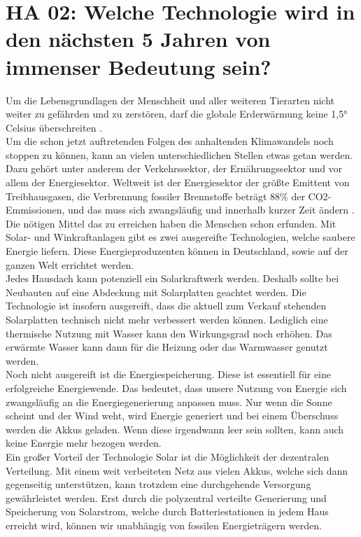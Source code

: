 \chapter{HA 02: Welche Technologie wird in den nächsten 5 Jahren von immenser Bedeutung sein?}
Um die Lebensgrundlagen der Menschheit und aller weiteren Tierarten nicht weiter zu gefährden und zu zerstören, darf die globale Erderwärmung keine 1,5° Celsius überschreiten \cite{masson-delmotte_ipcc_2019}.\\
Um die schon jetzt auftretenden Folgen des anhaltenden Klimawandels noch stoppen zu können, kann an vielen unterschiedlichen Stellen etwas getan werden. Dazu gehört unter anderem der Verkehrssektor, der Ernährungssektor und vor allem der Energiesektor. Weltweit ist der Energiesektor der größte Emittent von Treibhausgasen, die Verbrennung fossiler Brennstoffe beträgt 88\% der CO2-Emmissionen, und das muss sich zwangsläufig und innerhalb kurzer Zeit ändern \cite{quaschning_regenerative_2019}.\\
Die nötigen Mittel das zu erreichen haben die Menschen schon erfunden. Mit Solar- und Winkraftanlagen gibt es zwei ausgereifte Technologien, welche saubere Energie liefern. Diese Energieproduzenten können in Deutschland, sowie auf der ganzen Welt errichtet werden. \\
Jedes Hausdach kann potenziell ein Solarkraftwerk werden. Deshalb sollte bei Neubauten auf eine Abdeckung mit Solarplatten geachtet werden. Die Technologie ist insofern ausgereift, dass die aktuell zum Verkauf stehenden Solarplatten technisch nicht mehr verbessert werden können. Lediglich eine thermische Nutzung mit Wasser kann den Wirkungsgrad noch erhöhen. Das erwärmte Wasser kann dann für die Heizung oder das Warmwasser genutzt werden.\\
Noch nicht ausgereift ist die Energiespeicherung. Diese ist essentiell für eine erfolgreiche Energiewende. Das bedeutet, dass unsere Nutzung von Energie sich zwangsläufig an die Energiegenerierung anpassen muss. Nur wenn die Sonne scheint und der Wind weht, wird Energie generiert und bei einem Überschuss werden die Akkus geladen. Wenn diese irgendwann leer sein sollten, kann auch keine Energie mehr bezogen werden.\\
Ein großer Vorteil der Technologie Solar ist die Möglichkeit der dezentralen Verteilung. Mit einem weit verbeiteten Netz aus vielen Akkus, welche sich dann gegenseitig unterstützen, kann trotzdem eine durchgehende Versorgung gewährleistet werden. Erst durch die polyzentral verteilte Generierung und Speicherung von Solarstrom, welche durch Batteriestationen in jedem Haus erreicht wird, können wir unabhängig von fossilen Energieträgern werden.\\
